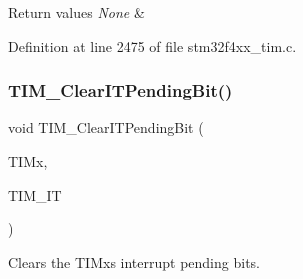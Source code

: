 \begin{DoxyRetVals}{Return values}
{\em None} & \\
\hline
\end{DoxyRetVals}


Definition at line 2475 of file stm32f4xx\+\_\+tim.\+c.

\mbox{\label{group___t_i_m_ga9eb1e95af71ed380f51a2c6d585cc5d6}} 
\subsubsection{\texorpdfstring{T\+I\+M\+\_\+\+Clear\+I\+T\+Pending\+Bit()}{TIM\_ClearITPendingBit()}}
{\footnotesize\ttfamily void T\+I\+M\+\_\+\+Clear\+I\+T\+Pending\+Bit (\begin{DoxyParamCaption}\item[{\hyperlink{struct_t_i_m___type_def}{T\+I\+M\+\_\+\+Type\+Def} $\ast$}]{T\+I\+Mx,  }\item[{uint16\+\_\+t}]{T\+I\+M\+\_\+\+IT }\end{DoxyParamCaption})}



Clears the T\+I\+Mx\textquotesingle{}s interrupt pending bits. 


